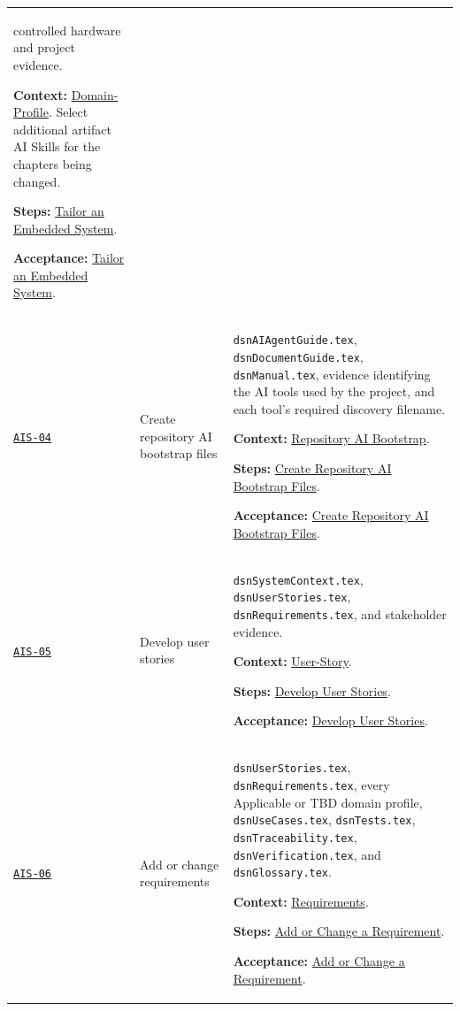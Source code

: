 \begin{tabularx}{\linewidth}{L{1.6cm}L{3.1cm}Y}
controlled hardware and project evidence.\par\textbf{Context:} \hyperref[Section:AIDomainContext]{Domain-Profile}. Select additional artifact AI Skills for the chapters being changed.\par\textbf{Steps:} \hyperref[Section:AIEmbeddedTaskSteps]{Tailor an Embedded System}.\par\textbf{Acceptance:} \hyperref[Section:AIEmbeddedAcceptance]{Tailor an Embedded System}.\\
\label{Skill:AIS-04}\hyperref[Section:AIBootstrapSteps]{\texttt{AIS-04}} & Create repository AI bootstrap files & \texttt{dsnAIAgentGuide.tex},
\texttt{dsnDocumentGuide.tex}, \texttt{dsnManual.tex}, evidence identifying the
AI tools used by the project, and each tool's required discovery filename.\par\textbf{Context:} \hyperref[Section:AIRepositoryBootstrap]{Repository AI Bootstrap}.\par\textbf{Steps:} \hyperref[Section:AIBootstrapTaskSteps]{Create Repository AI Bootstrap Files}.\par\textbf{Acceptance:} \hyperref[Section:AIBootstrapAcceptance]{Create Repository AI Bootstrap Files}.\\
\label{Skill:AIS-05}\hyperref[Section:AIStorySteps]{\texttt{AIS-05}} & Develop user stories & \texttt{dsnSystemContext.tex}, \texttt{dsnUserStories.tex}, \texttt{dsnRequirements.tex}, and stakeholder evidence.\par\textbf{Context:} \hyperref[Section:AIUserStoryContext]{User-Story}.\par\textbf{Steps:} \hyperref[Section:AIStoryTaskSteps]{Develop User Stories}.\par\textbf{Acceptance:} \hyperref[Section:AIStoryAcceptance]{Develop User Stories}.\\
\label{Skill:AIS-06}\hyperref[Section:AIRequirementSteps]{\texttt{AIS-06}} & Add or change requirements & \texttt{dsnUserStories.tex}, \texttt{dsnRequirements.tex}, every Applicable or TBD domain profile, \texttt{dsnUseCases.tex}, \texttt{dsnTests.tex}, \texttt{dsnTraceability.tex}, \texttt{dsnVerification.tex}, and \texttt{dsnGlossary.tex}.\par\textbf{Context:} \hyperref[Section:AIRequirementsContext]{Requirements}.\par\textbf{Steps:} \hyperref[Section:AIRequirementTaskSteps]{Add or Change a Requirement}.\par\textbf{Acceptance:} \hyperref[Section:AIRequirementAcceptance]{Add or Change a Requirement}.\\

\end{tabularx}
